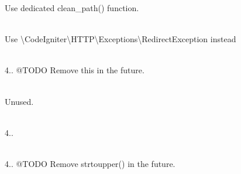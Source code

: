 \begin{DoxyRefList}
\label{deprecated__deprecated000099}%
%
Use dedicated {\ttfamily clean\+\_\+path()} function.  
\item[Class \doxylink{class_code_igniter_1_1_router_1_1_exceptions_1_1_redirect_exception}{Code\+Igniter\textbackslash{}Router\textbackslash{}Exceptions\textbackslash{}Redirect\+Exception} ]\hfill \\
\label{deprecated__deprecated000100}%
%
Use \textbackslash{}\+Code\+Igniter\textbackslash{}\+HTTP\textbackslash{}\+Exceptions\textbackslash{}\+Redirect\+Exception instead  
\item[Member \doxylink{class_code_igniter_1_1_router_1_1_route_collection_a9a62ad0d39504cb9292dee125c750bf2}{Code\+Igniter\textbackslash{}Router\textbackslash{}Route\+Collection\+::get\+Registered\+Controllers} (?string \$verb=\textquotesingle{} \texorpdfstring{$\ast$}{*}\textquotesingle{})]\hfill \\
\label{deprecated__deprecated000105}%
%
4.. @\+TODO Remove this in the future.  
\item[Member \doxylink{class_code_igniter_1_1_router_1_1_route_collection_a1475994043a80b9cd9caf02bf56bd1b7}{Code\+Igniter\textbackslash{}Router\textbackslash{}Route\+Collection\+::localize\+Route} (string \$route)]\hfill \\
\label{deprecated__deprecated000103}%
%
Unused.  
\item[Member \doxylink{class_code_igniter_1_1_router_1_1_route_collection_af235018f4c03ee5d2fe6c5612f7f91a8}{Code\+Igniter\textbackslash{}Router\textbackslash{}Route\+Collection\+::match} (array \$verbs=\mbox{[}\mbox{]}, string \$from=\textquotesingle{}\textquotesingle{}, \$to=\textquotesingle{}\textquotesingle{}, ?array \$options=null)]\hfill \\
\label{deprecated__deprecated000102}%
%
4..  
\item[Member \doxylink{class_code_igniter_1_1_router_1_1_route_collection_ad3d71070e57db58bb2b5555b293e397f}{Code\+Igniter\textbackslash{}Router\textbackslash{}Route\+Collection\+::set\+HTTPVerb} (string \$verb)]\hfill \\
\label{deprecated__deprecated000101}%
%
4.. @\+TODO Remove strtoupper() in the future.  
\item[Member \doxylink{class_code_igniter_1_1_router_1_1_router_ada83047c41ed0d96d65d553cbebdd9e1}{Code\+Igniter\textbackslash{}Router\textbackslash{}Router\+::scan\+Controllers} (array \$segments)]\hfill \\

\end{DoxyRefList}
